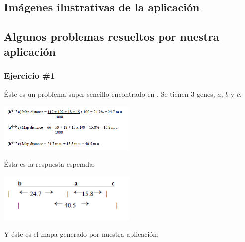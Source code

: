 \documentclass{article}
\begin{document}
	
	
	\subsection{Imágenes ilustrativas de la aplicación}
	
	
	\subsection{Algunos problemas resueltos por nuestra aplicación}
	
	\subsubsection{Ejercicio \#1}
	
	Éste es un problema super sencillo encontrado en \cite{carrinnes2003handbook}. Se tienen 3 genes, $a$, $b$ y $c$.
	
	\begin{center}
		\includegraphics[width=0.5\textwidth]{images/e_1.png}
	\end{center}
	
	Ésta es la respuesta esperada:
	
	\begin{center}
		\includegraphics[width=0.5\textwidth]{images/e_2.png}
	\end{center}
	
	Y éste es el mapa generado por nuestra aplicación:
	
\end{document}
